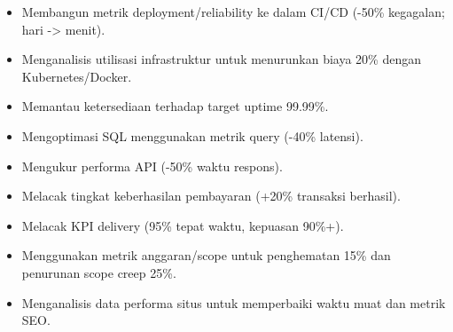 \vspace{4pt}
\begin{itemize}
  \item Membangun metrik deployment/reliability ke dalam CI/CD (-50\% kegagalan; hari -> menit).
  \item Menganalisis utilisasi infrastruktur untuk menurunkan biaya 20\% dengan Kubernetes/Docker.
  \item Memantau ketersediaan terhadap target uptime 99.99\%.
\end{itemize}
\vspace{4pt}
\begin{itemize}
  \item Mengoptimasi SQL menggunakan metrik query (-40\% latensi).
  \item Mengukur performa API (-50\% waktu respons).
  \item Melacak tingkat keberhasilan pembayaran (+20\% transaksi berhasil).
\end{itemize}
\vspace{4pt}
\begin{itemize}
  \item Melacak KPI delivery (95\% tepat waktu, kepuasan 90\%+).
  \item Menggunakan metrik anggaran/scope untuk penghematan 15\% dan penurunan scope creep 25\%.
\end{itemize}
\vspace{4pt}
\begin{itemize}
  \item Menganalisis data performa situs untuk memperbaiki waktu muat dan metrik SEO.
\end{itemize}